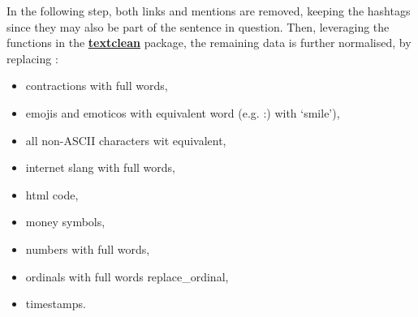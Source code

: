 \documentclass[11pt,]{article}
\newenvironment{Shaded}{\begin{snugshade}}{\end{snugshade}}
\newcommand{\CharTok}[1]{\textcolor[rgb]{0.31,0.60,0.02}{#1}}
\newcommand{\DataTypeTok}[1]{\textcolor[rgb]{0.13,0.29,0.53}{#1}}
\newcommand{\KeywordTok}[1]{\textcolor[rgb]{0.13,0.29,0.53}{\textbf{#1}}}
\newcommand{\NormalTok}[1]{#1}
\newcommand{\OperatorTok}[1]{\textcolor[rgb]{0.81,0.36,0.00}{\textbf{#1}}}
\newcommand{\StringTok}[1]{\textcolor[rgb]{0.31,0.60,0.02}{#1}}
\providecommand{\tightlist}{%
  \setlength{\itemsep}{0pt}\setlength{\parskip}{0pt}}
\begin{document}
\begin{Shaded}
\end{Shaded}

In the following step, both links and mentions are removed, keeping the
hashtags since they may also be part of the sentence in question. Then,
leveraging the functions in the
\textbf{\href{https://www.rdocumentation.org/packages/textclean/versions/0.9.3}{textclean}}
package, the remaining data is further normalised, by replacing :

\begin{itemize}
\tightlist
\item
  contractions with full words,
\item
  emojis and emoticos with equivalent word (e.g. :) with `smile'),
\item
  all non-ASCII characters wit equivalent,
\item
  internet slang with full words,
\item
  html code,
\item
  money symbols,
\item
  numbers with full words,
\item
  ordinals with full words replace\_ordinal,
\item
  timestamps.
\end{itemize}
\end{document}
